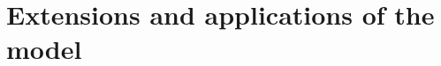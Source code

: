 \documentclass[letter]{article}
\theoremstyle{remark}
\begin{document}
\section{Extensions and applications of the model}


%
%





\end{document}
